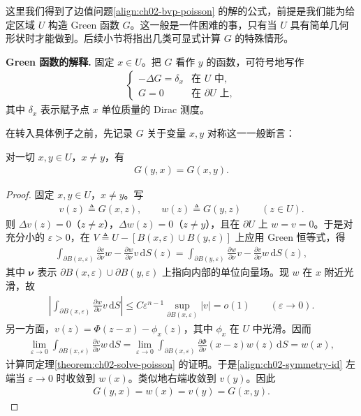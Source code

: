 \documentclass[../../main.tex]{subfiles}
\begin{document}
这里我们得到了边值问题\eqref{align:ch02-bvp-poisson} 的解的公式，前提是我们能为给定区域 $U$ 构造 Green 函数 $G$。这一般是一件困难的事，只有当 $U$ 具有简单几何形状时才能做到。后续小节将指出几类可显式计算 $G$ 的特殊情形。

\textbf{Green 函数的解释.} 固定 $x\in U$。把 $G$ 看作 $y$ 的函数，可符号地写作
\begin{align*}
\begin{cases}
-\Delta G=\delta_x & \text{在 }U\text{ 中},\\
G=0 & \text{在 }\partial U\text{ 上},
\end{cases}
\end{align*}
其中 $\delta_x$ 表示赋予点 $x$ 单位质量的 Dirac 测度。

在转入具体例子之前，先记录 $G$ 关于变量 $x,y$ 对称这一一般断言：

\begin{theorem}\label{theorem:ch02-green-symmetry}
对一切 $x,y\in U$，$x\neq y$，有
\begin{align*}
G(y,x)=G(x,y).
\end{align*}
\end{theorem}

\begin{proof}
固定 $x,y\in U$，$x\neq y$。写
\begin{align*}
v(z)\triangleq G(x,z),\qquad w(z)\triangleq G(y,z) \qquad (z\in U).
\end{align*}
则 $\Delta v(z)=0$（$z\neq x$），$\Delta w(z)=0$（$z\neq y$），且在 $\partial U$ 上 $w=v=0$。于是对充分小的 $\varepsilon>0$，在 $V\triangleq U-[B(x,\varepsilon)\cup B(y,\varepsilon)]$ 上应用 Green 恒等式，得
\begin{align}\label{align:ch02-symmetry-id}
\int_{\partial B(x,\varepsilon)}\frac{\partial v}{\partial\nu}w-\frac{\partial w}{\partial\nu}v\,\mathrm{d}S(z)
=\int_{\partial B(y,\varepsilon)}\frac{\partial w}{\partial\nu}v-\frac{\partial v}{\partial\nu}w\,\mathrm{d}S(z),
\end{align}
其中 $\boldsymbol{\nu}$ 表示 $\partial B(x,\varepsilon)\cup\partial B(y,\varepsilon)$ 上指向内部的单位向量场。现 $w$ 在 $x$ 附近光滑，故
\begin{align*}
\left|\int_{\partial B(x,\varepsilon)}\frac{\partial w}{\partial\nu}v\,\mathrm{d}S\right|\leqslant C\varepsilon^{n-1}\sup_{\partial B(x,\varepsilon)}|v|=o(1) \qquad (\varepsilon\to 0).
\end{align*}
另一方面，$v(z)=\Phi(z-x)-\phi_x(z)$，其中 $\phi_x$ 在 $U$ 中光滑。因而
\begin{align*}
\lim_{\varepsilon\to 0}\int_{\partial B(x,\varepsilon)}\frac{\partial v}{\partial\nu}w\,\mathrm{d}S
=\lim_{\varepsilon\to 0}\int_{\partial B(x,\varepsilon)}\frac{\partial\Phi}{\partial\nu}(x-z)w(z)\,\mathrm{d}S=w(x),
\end{align*}
计算同定理\cref{theorem:ch02-solve-poisson} 的证明。于是\eqref{align:ch02-symmetry-id} 左端当 $\varepsilon\to 0$ 时收敛到 $w(x)$。类似地右端收敛到 $v(y)$。因此
\begin{align*}
G(y,x)=w(x)=v(y)=G(x,y).
\end{align*}
\end{proof}
\end{document}
